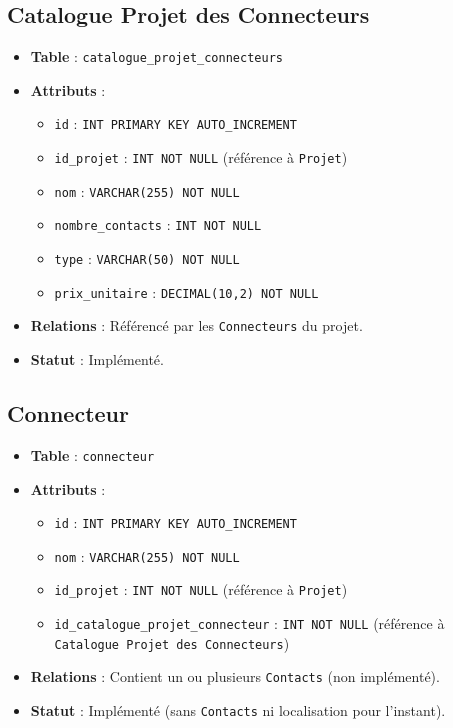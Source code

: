 \documentclass[a4paper,12pt]{article}
\begin{document}
\subsection{Catalogue Projet des Connecteurs}
\begin{itemize}
    \item \textbf{Table} : \texttt{catalogue\_projet\_connecteurs}
    \item \textbf{Attributs} :
    \begin{itemize}
        \item \texttt{id} : \texttt{INT PRIMARY KEY AUTO\_INCREMENT}
        \item \texttt{id\_projet} : \texttt{INT NOT NULL} (référence à \texttt{Projet})
        \item \texttt{nom} : \texttt{VARCHAR(255) NOT NULL}
        \item \texttt{nombre\_contacts} : \texttt{INT NOT NULL}
        \item \texttt{type} : \texttt{VARCHAR(50) NOT NULL}
        \item \texttt{prix\_unitaire} : \texttt{DECIMAL(10,2) NOT NULL}
    \end{itemize}
    \item \textbf{Relations} : Référencé par les \texttt{Connecteurs} du projet.
    \item \textbf{Statut} : Implémenté.
\end{itemize}

\subsection{Connecteur}
\begin{itemize}
    \item \textbf{Table} : \texttt{connecteur}
    \item \textbf{Attributs} :
    \begin{itemize}
        \item \texttt{id} : \texttt{INT PRIMARY KEY AUTO\_INCREMENT}
        \item \texttt{nom} : \texttt{VARCHAR(255) NOT NULL}
        \item \texttt{id\_projet} : \texttt{INT NOT NULL} (référence à \texttt{Projet})
        \item \texttt{id\_catalogue\_projet\_connecteur} : \texttt{INT NOT NULL} (référence à \texttt{Catalogue Projet des Connecteurs})
    \end{itemize}
    \item \textbf{Relations} : Contient un ou plusieurs \texttt{Contacts} (non implémenté).
    \item \textbf{Statut} : Implémenté (sans \texttt{Contacts} ni localisation pour l’instant).
\end{itemize}
\end{document}
